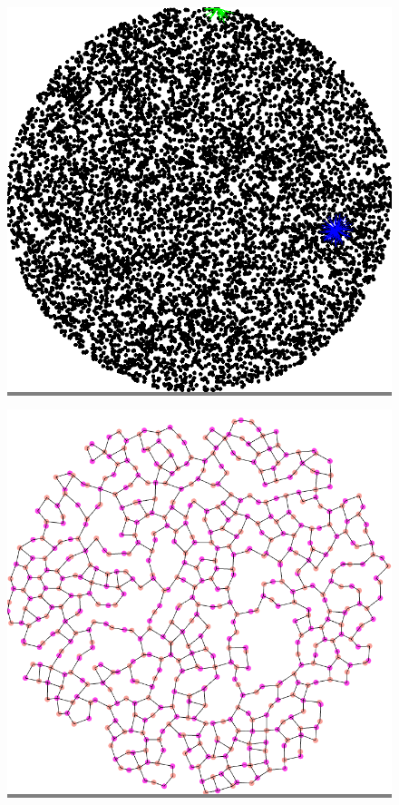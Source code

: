 \documentclass{article}
\begin{document}
\begin{figure}
    \begin{minipage}{0.3\textwidth}
    \colorbox{gray}{\includegraphics[width=\linewidth]{./images/disk_0.png}}
    \end{minipage}
    \hspace{\fill}
    \begin{minipage}{0.3\textwidth}
    \colorbox{gray}{\includegraphics[width=\linewidth]{./images/disk_0_bb_0.png}}

\end{minipage}
\end{figure}
\end{document}
